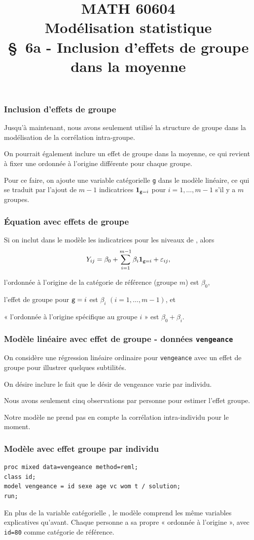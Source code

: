 \documentclass{beamer}
\title[\color{white}{MATH 60604 \S~6a - Inclusion d'effets de groupe dans la moyenne}]{\texorpdfstring{MATH 60604 \\Modélisation statistique \\ \S~6a - Inclusion d'effets de groupe dans la moyenne}{MATH 60604 \\Modélisation statistique \\ \S~6a - Inclusion d'effets de groupe dans la moyenne}}
\author{}
\institute{HEC Montréal\\
Département de sciences de la décision}
\date{}
\begin{document}
\frame{\titlepage}

\begin{frame}
 \frametitle{Inclusion d'effets de groupe}
 \bi 
 \item Jusqu'à maintenant, nous avons seulement utilisé la structure de groupe dans la modélisation de la corrélation intra-groupe.
 \item On pourrait également inclure un \alert{effet de groupe} dans la moyenne, ce qui revient à fixer une ordonnée à l'origine différente pour chaque groupe.
 \item Pour ce faire, on ajoute une variable catégorielle \texttt{g} dans le modèle linéaire, ce qui se traduit par l'ajout de $m-1$ indicatrices ${\mathbf 1}_{\texttt{g}=i}$ pour $i=1, \ldots, m-1$ s'il y a $m$ groupes. 
 \ei 
 \end{frame}
 \begin{frame}
 \frametitle{Équation avec effets de groupe}
 \bi
 \item Si on inclut dans le modèle les indicatrices pour les niveaux de , alors
 \[ Y_{ij}= \beta_0 + \sum_{i=1}^{m-1} \beta_i{\mathbf 1}_{\texttt{g}=i} + \varepsilon_{ij},\]
 \bi \item l'ordonnée à l'origine de la catégorie de référence (groupe $m$) est $\beta_0$,
 \item l'effet de groupe pour $\texttt{g}=i$ est $\beta_i$ $(i=1, \ldots, m-1)$, et 
 \item « l'ordonnée à l'origine spécifique au groupe $i$ » est $\beta_0+ \beta_i$.
 \ei
 \ei
  \end{frame}

\begin{frame}
\frametitle{Modèle linéaire avec effet de groupe - données \texttt{vengeance}}
On considère une régression linéaire ordinaire pour \texttt{vengeance} avec un effet de groupe pour illustrer quelques subtilités.
\bi
\item On désire inclure le fait que le désir de vengeance varie par individu.
\item Nous avons seulement cinq observations par personne pour estimer l'effet groupe.
\item Notre modèle ne prend pas en compte la corrélation intra-individu pour le moment.
\ei
\end{frame}





\begin{frame}[fragile]
\frametitle{Modèle avec effet groupe par individu}
\begin{tcolorbox}[colback=white, colframe=hecblue, title=Code \SASlang pour ajuster un modèle linéaire avec REML]
\begin{verbatim}
proc mixed data=vengeance method=reml; 
class id; 
model vengeance = id sexe age vc wom t / solution; 
run;
\end{verbatim}
\end{tcolorbox}
{\footnotesize En plus de la variable catégorielle , le modèle comprend les même variables explicatives qu'avant. Chaque personne a sa propre « ordonnée à l'origine », avec \texttt{id=80} comme catégorie de référence. 


}
\end{frame}
\end{document}
